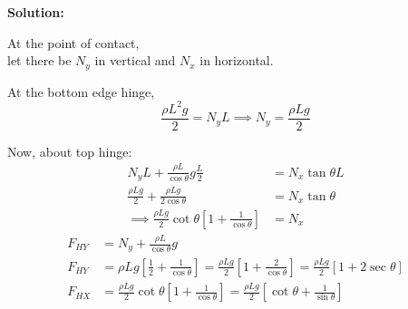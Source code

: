 \documentclass{article}
\theoremstyle{definition}
\newenvironment{solution}
  {\par\vspace{0.5em}\noindent\textbf{Solution:}\par\nopagebreak\vspace{0.3em}}
  {\par\vspace{1em}}
\begin{document}
\begin{solution}
    \noindent
    \begin{minipage}[t]{0.38\textwidth}
    \vspace{0pt}
    \end{minipage}%
    \hfill
    \begin{minipage}[t]{0.59\textwidth}
    \vspace{0pt}
    At the point of contact,\\
    let there be $N_y$ in vertical and $N_x$ in horizontal.
    
    \vspace{0.5em}
    \noindent At the bottom edge hinge,
    \[
    \frac{\rho L^2 g}{2} = N_y L
     \implies N_y = \frac{\rho L g}{2}
    \]
    \end{minipage}
    
    \vspace{0.5em}
    \noindent Now, about top hinge:
    \begin{align*}
    N_y L + \frac{\rho L}{\cos\theta} g \frac{L}{2} &= N_x \tan\theta L \\[6pt]
    \frac{\rho L g}{2} + \frac{\rho L g}{2\cos\theta} &= N_x \tan\theta \\[6pt]
    \implies \frac{\rho L g}{2} \cot\theta \left[ 1 + \frac{1}{\cos\theta} \right] &= N_x
    \end{align*}
    \begin{align*}
    F_{HY} &= N_y + \frac{\rho L}{\cos\theta} g \\[8pt]
    F_{HY} &= \rho L g \left[ \frac{1}{2} + \frac{1}{\cos\theta} \right] = \frac{\rho L g}{2} \left[ 1 + \frac{2}{\cos\theta} \right] = \frac{\rho L g}{2} \left[ 1 + 2 \sec\theta \right] \\[8pt]
    F_{HX} &= \frac{\rho L g}{2} \cot\theta \left[ 1 + \frac{1}{\cos\theta} \right] = \frac{\rho L g}{2} \left[ \cot\theta + \frac{1}{\sin\theta} \right]
    \end{align*}
    

\end{solution}
\end{document}
